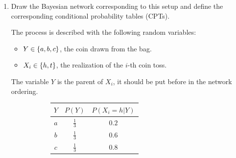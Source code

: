 \documentclass[11pt, a4paper]{article}
\begin{document}
\begin{enumerate}
    \item Draw the Bayesian network corresponding to this setup and define the corresponding conditional probability tables (CPTs).

    \begin{solution}
        The process is described with the following random variables:
        \begin{itemize}
            \item $Y \in \{a, b, c\}$, the coin drawn from the bag.
            \item $X_i \in \{h, t\}$, the realization of the $i$-th coin toss.
        \end{itemize}
        The variable $Y$ is the parent of $X_i$, it should be put before in the network ordering.

        \begin{figure}[h]
            \begin{subfigure}[c]{0.495\textwidth}
                \centering
            \end{subfigure}
            \begin{subfigure}[c]{0.495\textwidth}
                \centering
                \begin{tabular}{c|cc}
                    \toprule
                     $Y$ & $P(Y)$ & $P(X_i = h | Y)$ \\
                     \midrule
                     $a$ & $\frac{1}{3}$ & $0.2$ \\
                     $b$ & $\frac{1}{3}$ & $0.6$ \\
                     $c$ & $\frac{1}{3}$ & $0.8$ \\
                    \bottomrule
                \end{tabular}
            \end{subfigure}
        \end{figure}
    \end{solution}


\end{enumerate}
\end{document}
